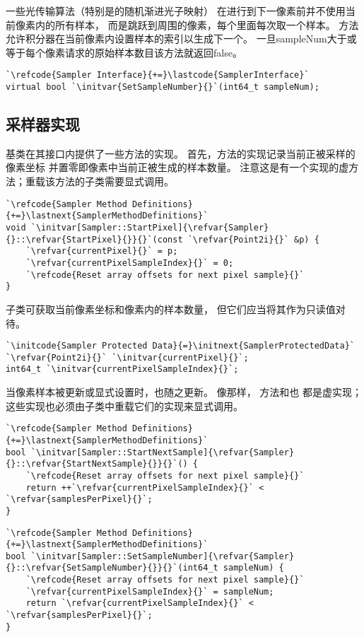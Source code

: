 一些光传输算法（特别是的随机渐进光子映射）
在进行到下一像素前并不使用当前像素内的所有样本，
而是跳跃到周围的像素，每个里面每次取一个样本。
方法允许积分器在当前像素内设置样本的索引以生成下一个。
一旦{\ttfamily sampleNum}大于或等于每个像素请求的原始样本数目该方法就返回{\ttfamily false}。
\begin{lstlisting}
`\refcode{Sampler Interface}{+=}\lastcode{SamplerInterface}`
virtual bool `\initvar{SetSampleNumber}{}`(int64_t sampleNum);
\end{lstlisting}

\subsection{采样器实现}\label{sub:采样器实现}
基类在其接口内提供了一些方法的实现。
首先，方法的实现记录当前正被采样的像素坐标
并置零即像素中当前正被生成的样本数量。
注意这是有一个实现的虚方法；重载该方法的子类需要显式调用。
\begin{lstlisting}
`\refcode{Sampler Method Definitions}{+=}\lastnext{SamplerMethodDefinitions}`
void `\initvar[Sampler::StartPixel]{\refvar{Sampler}{}::\refvar{StartPixel}{}}{}`(const `\refvar{Point2i}{}` &p) {
    `\refvar{currentPixel}{}` = p;
    `\refvar{currentPixelSampleIndex}{}` = 0;
    `\refcode{Reset array offsets for next pixel sample}{}`
}
\end{lstlisting}

子类可获取当前像素坐标和像素内的样本数量，
但它们应当将其作为只读值对待。
\begin{lstlisting}
`\initcode{Sampler Protected Data}{=}\initnext{SamplerProtectedData}`
`\refvar{Point2i}{}` `\initvar{currentPixel}{}`;
int64_t `\initvar{currentPixelSampleIndex}{}`;
\end{lstlisting}

当像素样本被更新或显式设置时，也随之更新。
像那样，
方法和也
都是虚实现；这些实现也必须由子类中重载它们的实现来显式调用。
\begin{lstlisting}
`\refcode{Sampler Method Definitions}{+=}\lastnext{SamplerMethodDefinitions}`
bool `\initvar[Sampler::StartNextSample]{\refvar{Sampler}{}::\refvar{StartNextSample}{}}{}`() {
    `\refcode{Reset array offsets for next pixel sample}{}`
    return ++`\refvar{currentPixelSampleIndex}{}` < `\refvar{samplesPerPixel}{}`;
}
\end{lstlisting}
\begin{lstlisting}
`\refcode{Sampler Method Definitions}{+=}\lastnext{SamplerMethodDefinitions}`
bool `\initvar[Sampler::SetSampleNumber]{\refvar{Sampler}{}::\refvar{SetSampleNumber}{}}{}`(int64_t sampleNum) {
    `\refcode{Reset array offsets for next pixel sample}{}`
    `\refvar{currentPixelSampleIndex}{}` = sampleNum;
    return `\refvar{currentPixelSampleIndex}{}` < `\refvar{samplesPerPixel}{}`;
}
\end{lstlisting}

